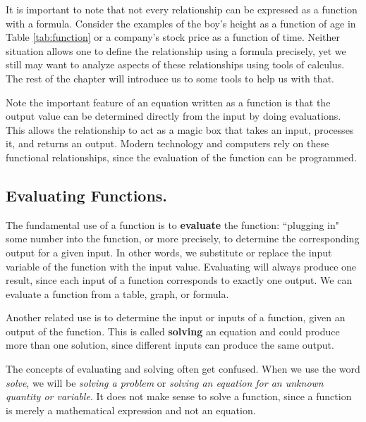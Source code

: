 It is important to note that not every relationship can be expressed as a function with a formula. Consider the examples of the boy's height as a function of age in Table \ref{tab:function} or a company's stock price as a function of time. Neither situation allows one to define the relationship using a formula precisely, yet we still may want to analyze aspects of these relationships using tools of calculus. The rest of the chapter will introduce us to some tools to help us with that.

Note the important feature of an equation written as a function is that the output value can be determined directly from the input by doing evaluations. This allows the relationship to act as a magic box that takes an input, processes it, and returns an output. Modern technology and computers rely on these functional relationships, since the evaluation of the function can be programmed.

\subsection{Evaluating Functions.}

The fundamental use of a function is to {\bf evaluate} the function: ``plugging in" some number into the function, or more precisely, to determine the corresponding output for a given input. In other words, we substitute or replace the input variable of the function with the input value. Evaluating will always produce one result, since each input of a function corresponds to exactly one output. We can evaluate a function from a table, graph, or formula.

Another related use is to determine the input or inputs of a function, given an output of the function. This is called {\bf solving} an equation and could produce more than one solution, since different inputs can produce the same output.

\begin{remark}
The concepts of evaluating and solving often get confused. When we use the word {\em solve}, we will be {\em solving a problem} or {\em solving an equation for an unknown quantity or variable}. It does not make sense to solve a function, since a function is merely a mathematical expression and not an equation.
\end{remark}

